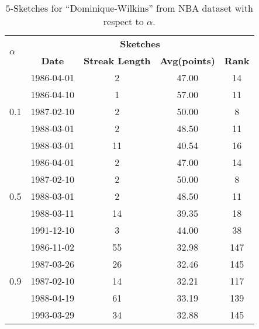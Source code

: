 \begin{table}[h]
\center
\caption{$5$-Sketches for ``Dominique-Wilkins'' from NBA dataset with respect to $\alpha$.}
\label{tbl:real-alpha}
\begin{tabular}{|l|c|c|c|c|}
\hline
\multirow{2}{*}{$\alpha$}   & \multicolumn{4}{c|}{\textbf{Sketches}}   \\
	\cline{2-5}
            & \textbf{Date}       & \textbf{Streak Length} & \textbf{Avg(points)} & \textbf{Rank} \\
\hline
\multirow{5}{*}{0.1} & 1986-04-01 & 2             & 47.00      & 14   \\
				     & 1986-04-10 & 1             & 57.00      & 11   \\                     
                     & 1987-02-10 & 2             & 50.00      & 8    \\
                     & 1988-03-01 & 2             & 48.50      & 11   \\
                     & 1988-03-01 & 11            & 40.54      & 16   \\
\hline
\multirow{5}{*}{0.5} & 1986-04-01 & 2             & 47.00      & 14   \\
                     & 1987-02-10 & 2             & 50.00      & 8    \\
                     & 1988-03-01 & 2             & 48.50      & 11   \\
                     & 1988-03-11 & 14            & 39.35      & 18   \\
                     & 1991-12-10 & 3             & 44.00      & 38   \\
\hline                     
\multirow{5}{*}{0.9} & 1986-11-02 & 55            & 32.98      & 147   \\
                     & 1987-03-26 & 26            & 32.46      & 145  \\
                     & 1987-02-10 & 14            & 32.21      & 117 \\                     
                     & 1988-04-19 & 61            & 33.19      & 139  \\
                     & 1993-03-29 & 34            & 32.88      & 145  \\
\hline
\end{tabular}
\end{table}


